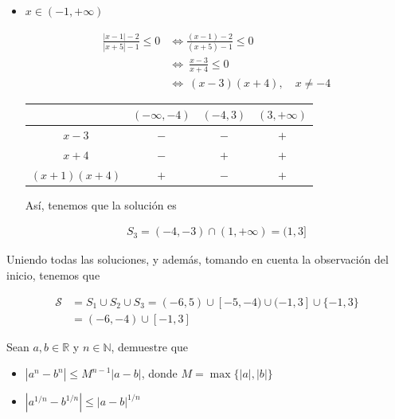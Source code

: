 \documentclass[12pt]{book}
\begin{document}
\begin{itemize}
\begin{align*}
    S_2= [-5,-1) \cap \left[ (-\infty,-4) \cup (-1,+\infty)\right]
    &= [-5,4)
\end{align*}

\item $x \in (-1,+\infty)$

\begin{align*}
       \frac{|x-1|-2}{|x+5|-1} \leq 0  &\Longleftrightarrow    \frac{(x-1)-2}{(x+5)-1} \leq 0 \\ \ &\Longleftrightarrow \ \frac{x-3}{x+4} \leq 0 \\
        &\Longleftrightarrow \ (x-3)(x+4), \quad x \neq -4
    \end{align*}

\begin{center}
\begin{tabular}{|c|c|c|c|}
\hline
   & $(-\infty,-4) $  & $(-4,3)$ & $(3,+\infty)$ \\
   \hline
   $x-3$ & $-$ &$-$ &  $+$ \\ \hline
   $x+4$ & $-$ & $+$ & $+$ \\ \hline \hline
\rule{0pt}{0pt} $\displaystyle (x+1)(x+4)$ & $+$ & $-$ & $+$ \\
   \hline
\end{tabular}
\end{center}
Así, tenemos que la solución es 

\begin{align*}
    S_3=(-4,-3) \cap (1,+\infty)=(1,3]
\end{align*}
\end{itemize}
Uniendo todas las soluciones, y además, tomando en cuenta la observación del inicio, tenemos que

\begin{align*}
    \mathcal{S}&=S_1 \cup S_2 \cup S_3 = (-6,5)\cup [-5,-4)\cup (-1,3] \cup \{-1,3\} \\
    &=(-6,-4) \cup [-1,3]
\end{align*}

\begin{prob}{}{}
    Sean $a,b \in \mathbb{R}$ y $n \in \mathbb{N}$, demuestre que 

    \begin{itemize}
        \item[\textbf{a)}] $|a^n-b^n|\leq M^{n-1}|a-b|$, donde $M=\max\{|a|,|b|\}$
        \item[\textbf{b)}] $|a^{1/n}-b^{1/n}|\leq |a-b|^{1/n}$
    \end{itemize}
\end{prob}
\end{document}
